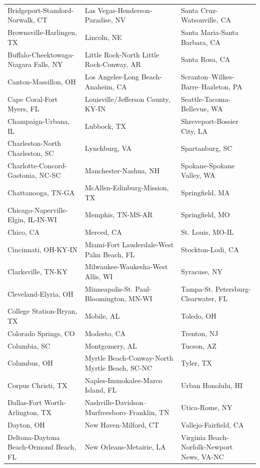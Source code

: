\begin{longtable}[t]{>{\raggedright\arraybackslash}p{4.6cm}>{\raggedright\arraybackslash}p{4.6cm}>{\raggedright\arraybackslash}p{4.6cm}}
Bridgeport-Stamford-Norwalk, CT & Las Vegas-Henderson-Paradise, NV & Santa Cruz-Watsonville, CA\\
Brownsville-Harlingen, TX & Lincoln, NE & Santa Maria-Santa Barbara, CA\\
\addlinespace
Buffalo-Cheektowaga-Niagara Falls, NY & Little Rock-North Little Rock-Conway, AR & Santa Rosa, CA\\
Canton-Massillon, OH & Los Angeles-Long Beach-Anaheim, CA & Scranton--Wilkes-Barre--Hazleton, PA\\
Cape Coral-Fort Myers, FL & Louisville/Jefferson County, KY-IN & Seattle-Tacoma-Bellevue, WA\\
Champaign-Urbana, IL & Lubbock, TX & Shreveport-Bossier City, LA\\
Charleston-North Charleston, SC & Lynchburg, VA & Spartanburg, SC\\
\addlinespace
Charlotte-Concord-Gastonia, NC-SC & Manchester-Nashua, NH & Spokane-Spokane Valley, WA\\
Chattanooga, TN-GA & McAllen-Edinburg-Mission, TX & Springfield, MA\\
Chicago-Naperville-Elgin, IL-IN-WI & Memphis, TN-MS-AR & Springfield, MO\\
Chico, CA & Merced, CA & St. Louis, MO-IL\\
Cincinnati, OH-KY-IN & Miami-Fort Lauderdale-West Palm Beach, FL & Stockton-Lodi, CA\\
\addlinespace
Clarksville, TN-KY & Milwaukee-Waukesha-West Allis, WI & Syracuse, NY\\
Cleveland-Elyria, OH & Minneapolis-St. Paul-Bloomington, MN-WI & Tampa-St. Petersburg-Clearwater, FL\\
College Station-Bryan, TX & Mobile, AL & Toledo, OH\\
Colorado Springs, CO & Modesto, CA & Trenton, NJ\\
Columbia, SC & Montgomery, AL & Tucson, AZ\\
\addlinespace
Columbus, OH & Myrtle Beach-Conway-North Myrtle Beach, SC-NC & Tyler, TX\\
Corpus Christi, TX & Naples-Immokalee-Marco Island, FL & Urban Honolulu, HI\\
Dallas-Fort Worth-Arlington, TX & Nashville-Davidson--Murfreesboro--Franklin, TN & Utica-Rome, NY\\
Dayton, OH & New Haven-Milford, CT & Vallejo-Fairfield, CA\\
Deltona-Daytona Beach-Ormond Beach, FL & New Orleans-Metairie, LA & Virginia Beach-Norfolk-Newport News, VA-NC\\

\end{longtable}

